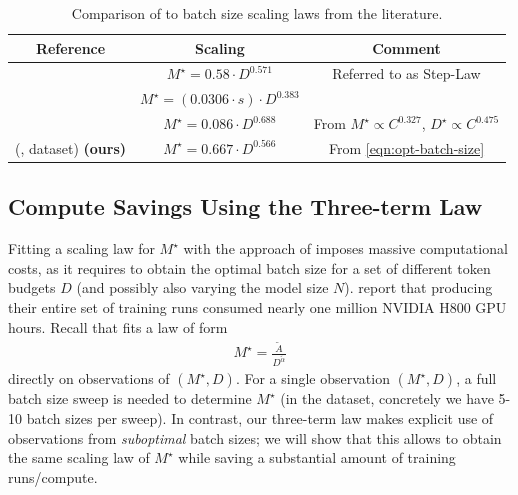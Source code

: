 \documentclass[12pt,a4paper,twoside]{article}
\begin{document}
%
%
\begin{table}[h]
    \caption{Comparison of \tttl{} to batch size scaling laws from the literature.}
    \label{tab:literature-bs-scaling}
    \centering
    \begin{tabular}{|c|c|c|}
    \hline
         Reference & Scaling & Comment \\ \hline \hline
         \citep{Li2025} & $M^\star = 0.58\cdot D^{0.571}$ & Referred to as Step-Law \\
         \citep{Bergsma2025} & $M^\star = (0.0306 \cdot s) \cdot D^{0.383}$  & \\
         \citep{DeepSeekAI2024}& $M^\star = 0.086 \cdot D^{0.688}$ & From $M^\star \propto C^{0.327}$, $D^\star \propto C^{0.475}$ \\[3pt]
         \hline \hline
         (\tttl{}, \li{} dataset) \textbf{(ours)} & $M^\star = 0.667 \cdot D^{0.566}$ & From \eqref{eqn:opt-batch-size} \\[1pt]
         \hline
    \end{tabular}
\end{table}
%
\subsection{Compute Savings Using the Three-term Law}\label{sec:saving-compute}

Fitting a scaling law for $M^\star$ with the approach of \citet{Li2025} imposes massive computational costs, as it requires to obtain the optimal batch size for a set of different token budgets $D$ (and possibly also varying the model size $N$). \citet{Li2025} report that producing their entire set of training runs consumed nearly one million NVIDIA H800 GPU hours. Recall that \citet{Li2025} fits a law of form
\begin{align}\label{eqn:direct-fit-Mstar}
    M^\star = \frac{\tilde{A}}{D^{\tilde{\alpha}}}
\end{align}
directly on observations of $(M^\star, D)$. For a single observation $(M^\star, D)$, a full batch size sweep is needed to determine $M^\star$ (in the \li{} dataset, concretely we have 5-10 batch sizes per sweep). In contrast, our three-term law makes explicit use of observations from \emph{suboptimal} batch sizes; we will show that this allows to obtain the same scaling law of $M^\star$ while saving a substantial amount of training runs/compute.
\end{document}
